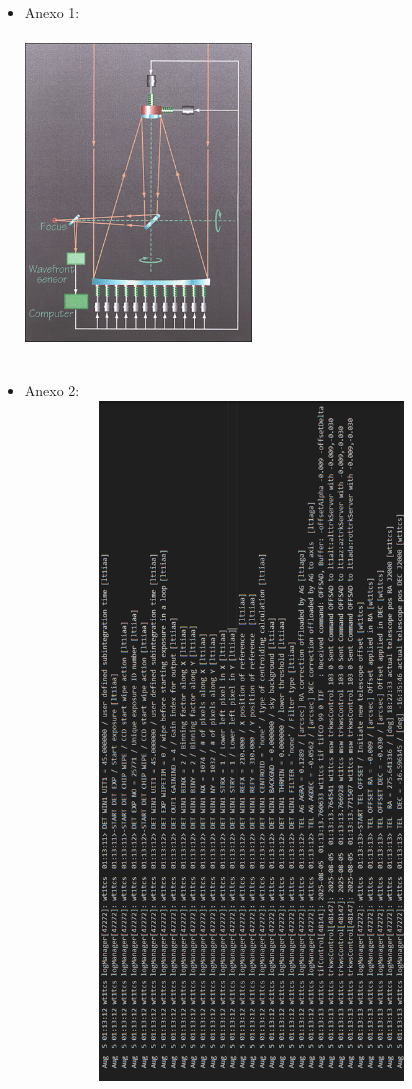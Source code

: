 
\begin{itemize}
    \item Anexo 1:
        \\
        \vspace{3.5cm}
        \includegraphics[width=6cm,height=9cm]{figures/actopt2.jpg} \\
        \vspace{3.5cm}


    \item Anexo 2:
        \\
        \vspace{3.5cm}
        \includegraphics[width=12cm,height=18cm]{figures/log_vertical.png} \\
        \vspace{3.5cm}


\end{itemize}
